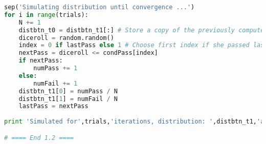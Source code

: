 \documentclass[fleqn]{hw8}
\begin{document}
\begin{lstlisting}[language=python]
sep('Simulating distribution until convergence ...')
for i in range(trials):
    N += 1
    distbtn_t0 = distbtn_t1[:] # Store a copy of the previously computed distribution to t0
    diceroll = random.random()
    index = 0 if lastPass else 1 # Choose first index if she passed last term, otherwise choose second
    nextPass = diceroll <= condPass[index]
    if nextPass:
        numPass += 1
    else:
        numFail += 1
    distbtn_t1[0] = numPass / N
    distbtn_t1[1] = numFail / N
    lastPass = nextPass
        
print 'Simulated for',trials,'iterations, distribution: ',distbtn_t1,'achieved after',N,'iterations.', endl

# ==== End 1.2 ====

\end{lstlisting}
\end{document}
